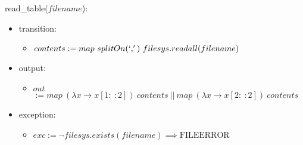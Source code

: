 \documentclass[12pt,fleqn]{article}
\begin{document}
read\_table($filename$):
\begin{itemize}
\item transition: \begin{itemize}
                        \item[] $contents := map~splitOn(`,')~filesys.readall(filename)$
                        \end{itemize}
\item output: \begin{itemize}
                    \item[] $out$ \tabto{1.5cm} $ := map~(\lambda x \rightarrow x[1:~:2])~contents~||~map~(\lambda x \rightarrow x[2:~:2])~contents$
                    \end{itemize}
\item exception: \begin{itemize}
                        \item[] $exc := \neg filesys.exists(filename) \implies \textrm{FILEERROR}$
                        \end{itemize}
\end{itemize}
\end{document}
